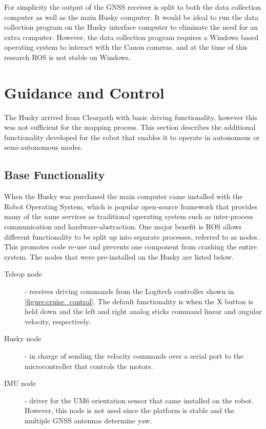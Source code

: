 For simplicity the output of the GNSS receiver is split to both the data collection computer as well as the main Husky computer.  It would be ideal to run the data collection program on the Husky interface computer to eliminate the need for an extra computer.  However, the data collection program requires a Windows based operating system to interact with the Canon cameras, and at the time of this research ROS is not stable on Windows. 

\section{Guidance and Control}

The Husky arrived from Clearpath with basic driving functionality, however this was not sufficient for the mapping process.  This section describes the additional functionality developed for the robot that enables it to operate in autonomous or semi-autonomous modes.  

\subsection{Base Functionality}
\label{section:base_functionality}

When the Husky was purchased the main computer came installed with the Robot Operating System, which is popular open-source framework that provides many of the same services as traditional operating system such as inter-process communication and hardware-abstraction.  One major benefit is ROS allows different functionality to be split up into separate processes, referred to as nodes.  This promotes code re-use and prevents one component from crashing the entire system.   The nodes that were pre-installed on the Husky are listed below.

\begin{description}
\item[Teleop node] - receives driving commands from the Logitech controller shown in \ref{figure:cruise_control}.  The default functionality is when the X button is held down and the left and right analog sticks command linear and angular velocity, respectively.
\item[Husky node] - in charge of sending the velocity commands over a serial port to the microcontroller that controls the motors.  
\item[IMU node] - driver for the UM6 orientation sensor that came installed on the robot.  However, this node is not used since the platform is stable and the multiple GNSS antennas determine yaw.
\end{description}

